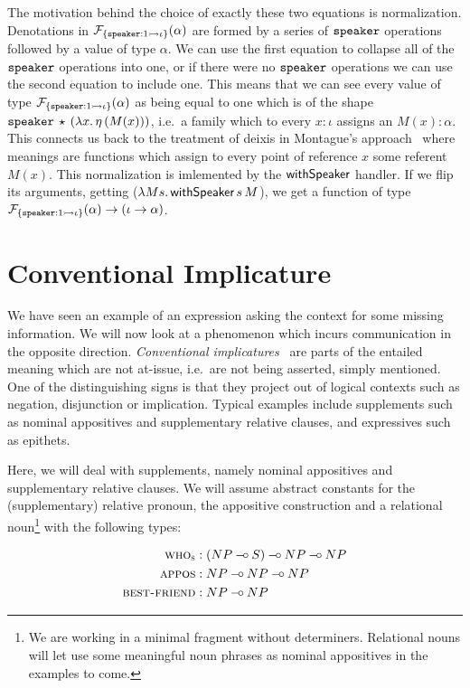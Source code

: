 The motivation behind the choice of exactly these two equations is
normalization. Denotations in
$\mathcal{F}_{\{ \mathtt{speaker} : 1 \rightarrowtail \iota \}}(\alpha)$ are formed by a series of
$\mathtt{speaker}$ operations followed by a value of type $\alpha$. We can use
the first equation to collapse all of the $\mathtt{speaker}$ operations into
one, or if there were no $\mathtt{speaker}$ operations we can use the second
equation to include one. This means that we can see every value of type
$\mathcal{F}_{\{ \mathtt{speaker} : 1 \rightarrowtail \iota \}}(\alpha)$ as being equal to one
which is of the shape
$\mathtt{speaker}\,\star\,(\lambda x.\, \eta\,(M(x)))$, i.e.\ a family which
to every $x : \iota$ assigns an $M(x) : \alpha$. This connects us back to
the treatment of deixis in Montague's approach~\cite{montague1973proper}
where meanings are functions which assign to every point of reference $x$
some referent $M(x)$. This normalization is imlemented by the
$\textsf{withSpeaker}$ handler. If we flip its arguments, getting
($\lambda M s.\, \textsf{withSpeaker}\,s\,M$), we get a function of type
$\mathcal{F}_{\{ \mathtt{speaker} : 1 \rightarrowtail \iota \}}(\alpha) \to (\iota \to \alpha)$.


\section{Conventional Implicature}
\label{sec:conventional-implicature}

We have seen an example of an expression asking the context for some
missing information. We will now look at a phenomenon which incurs
communication in the opposite direction. \emph{Conventional
  implicatures}~\cite{potts2005logic} are parts of the entailed meaning
which are not at-issue, i.e.\ are not being asserted, simply mentioned. One
of the distinguishing signs is that they project out of logical contexts
such as negation, disjunction or implication. Typical examples include
supplements such as nominal appositives and supplementary relative clauses,
and expressives such as epithets.

Here, we will deal with supplements, namely nominal appositives and
supplementary relative clauses. We will assume abstract constants for the
(supplementary) relative pronoun, the appositive construction and a
relational noun\footnote{We are working in a minimal fragment without
  determiners. Relational nouns will let use some meaningful noun phrases
  as nominal appositives in the examples to come.} with the following
types:

\begin{align*}
  \textsc{who}_{\textsc{s}} &: (NP \mathbin{{-}\mkern-3.5mu{\circ}} S) \mathbin{{-}\mkern-3.5mu{\circ}} NP \mathbin{{-}\mkern-3.5mu{\circ}} NP \\
  \textsc{appos} &: NP \mathbin{{-}\mkern-3.5mu{\circ}} NP \mathbin{{-}\mkern-3.5mu{\circ}} NP \\
  \textsc{best-friend} &: NP \mathbin{{-}\mkern-3.5mu{\circ}} NP
\end{align*}

